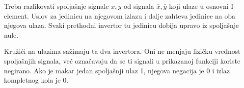 
Treba razlikovati spoljašnje signale \(x,y\) od signala \(\bar{x},\bar{y}\) koji ulaze u osnovni I element. Uslov za jedinicu na njegovom izlazu i dalje zahteva jedinice na oba njegova ulaza. Svaki prethodni invertor tu jedinicu dobija upravo iz spoljašnje nule.

Kružići na ulazima sažimaju ta dva invertora. Oni ne menjaju fizičku vrednost spoljašnjih signala, već označavaju da se ti signali u prikazanoj funkciji koriste negirano. Ako je makar jedan spoljašnji ulaz 1, njegova negacija je 0 i izlaz kompletnog kola je 0.

